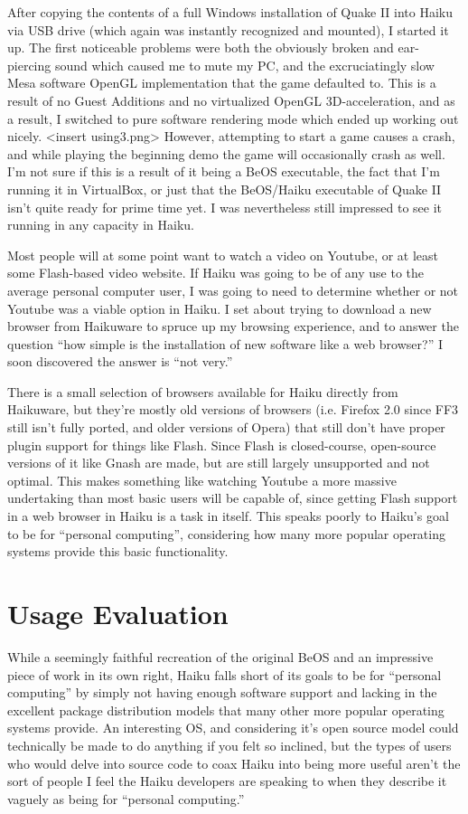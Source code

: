 \documentclass{article}
\begin{document}
After copying the contents of a full Windows installation of Quake 
II into Haiku via USB drive (which again was instantly recognized and mounted), 
I started it up. The first noticeable problems were both the obviously broken 
and ear-piercing sound which caused me to mute my PC, and the excruciatingly 
slow Mesa software OpenGL implementation that the game defaulted to. This is 
a result of no Guest Additions and no virtualized OpenGL 3D-acceleration, 
and as a result, I switched to pure software rendering mode which ended up 
working out nicely. <insert using3.png> However, attempting to start a game 
causes a crash, and while playing the beginning demo the game will occasionally 
crash as well. I’m not sure if this is a result of it being a BeOS executable, 
the fact that I’m running it in VirtualBox, or just that the BeOS/Haiku executable 
of Quake II isn’t quite ready for prime time yet. I was nevertheless still impressed 
to see it running in any capacity in Haiku.
	
Most people will at some point want to watch a video on Youtube, or at 
least some Flash-based video website. If Haiku was going to be of any use to the 
average personal computer user, I was going to need to determine whether or not 
Youtube was a viable option in Haiku. I set about trying to download a new browser 
from Haikuware to spruce up my browsing experience, and to answer the question 
“how simple is the installation of new software like a web browser?”  I soon 
discovered the answer is “not very.”

There is a small selection of browsers available for Haiku directly from Haikuware, 
but they’re mostly old versions of browsers (i.e. Firefox 2.0 since FF3 still isn’t 
fully ported, and older versions of Opera) that still don’t have proper plugin 
support for things like Flash. Since Flash is closed-course, open-source versions 
of it like Gnash are made, but are still largely unsupported and not optimal. 
This makes something like watching Youtube a more massive undertaking than most 
basic users will be capable of, since getting Flash support in a web browser in 
Haiku is a task in itself.  This speaks poorly to Haiku’s goal to be for “personal computing”, 
considering how many more popular operating systems provide this basic functionality.

\section{Usage Evaluation}

While a seemingly faithful recreation of the original BeOS and an impressive piece of work in 
its own right, Haiku falls short of its goals to be for “personal computing” by simply not 
having enough software support and lacking in the excellent package distribution models 
that many other more popular operating systems provide. An interesting OS, and considering 
it’s open source model could technically be made to do anything if you felt so inclined, 
but the types of users who would delve into source code to coax Haiku into being more 
useful aren’t the sort of people I feel the Haiku developers are speaking to when they 
describe it vaguely as being for “personal computing.”

{}

\end{document}
